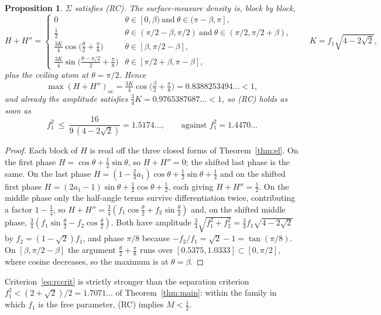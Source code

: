 \documentclass[11pt]{article}
\newtheorem{proposition}[theorem]{Proposition}
\theoremstyle{definition}
\newcommand{\Sig}{\Sigma}
\begin{document}
\begin{proposition}\label{prop:rcsigma}
$\Sig$ satisfies (RC). The surface-measure density is, block by block,
\[
  H+H''=
  \begin{cases}
    0 & \theta\in[0,\beta)\ \text{and}\ \theta\in(\pi-\beta,\pi],\\
    \tfrac12 & \theta\in(\pi/2-\beta,\pi/2)\ \text{and}\ \theta\in(\pi/2,\pi/2+\beta),\\
    \tfrac{3K}{4}\cos\bigl(\tfrac\theta2+\tfrac\pi8\bigr) & \theta\in[\beta,\pi/2-\beta],\\
    \tfrac{3K}{4}\sin\bigl(\tfrac{\theta-\pi/2}{2}+\tfrac\pi8\bigr)
      & \theta\in[\pi/2+\beta,\pi-\beta],
  \end{cases}
  \qquad K=f_1\sqrt{4-2\sqrt2},
\]
plus the ceiling atom at $\theta=\pi/2$. Hence
\[
  \max(H+H'')_{\mathrm{ac}}
  =\tfrac{3K}{4}\cos\bigl(\tfrac\beta2+\tfrac\pi8\bigr)=0.8388253494\ldots<1 ,
\]
and already the amplitude satisfies $\tfrac34K=0.9765387687\ldots<1$, so (RC) holds as
soon as
\begin{equation}\label{eq:rccrit}
  f_1^2\ \le\ \frac{16}{9\,(4-2\sqrt2)}=1.5174\ldots,
  \qquad\text{against } f_1^2=1.4470\ldots
\end{equation}
\end{proposition}

\begin{proof}
Each block of $H$ is read off the three closed forms of Theorem~\ref{thm:el}. On the
first phase $H=\cos\theta+\tfrac12\sin\theta$, so $H+H''=0$; the shifted last phase is
the same. On the last phase $H=(1-\tfrac23a_1)\cos\theta+\tfrac12\sin\theta+\tfrac12$ and
on the shifted first phase $H=(2a_1-1)\sin\theta+\tfrac12\cos\theta+\tfrac12$, each giving
$H+H''=\tfrac12$. On the middle phase only the half-angle terms survive
differentiation twice, contributing a factor $1-\tfrac14$, so
$H+H''=\tfrac34(f_1\cos\tfrac\theta2+f_2\sin\tfrac\theta2)$ and, on the shifted middle
phase, $\tfrac34(f_1\sin\tfrac\theta2-f_2\cos\tfrac\theta2)$. Both have amplitude
$\tfrac34\sqrt{f_1^2+f_2^2}=\tfrac34f_1\sqrt{4-2\sqrt2}$ by
$f_2=(1-\sqrt2)f_1$, and phase $\pi/8$ because $-f_2/f_1=\sqrt2-1=\tan(\pi/8)$. On
$[\beta,\pi/2-\beta]$ the argument $\tfrac\theta2+\tfrac\pi8$ runs over
$[0.5375,1.0333]\subset[0,\pi/2]$, where cosine decreases, so the maximum is at
$\theta=\beta$.
\end{proof}

Criterion~\eqref{eq:rccrit} is strictly stronger than the separation criterion
$f_1^2<(2+\sqrt2)/2=1.7071\ldots$ of Theorem~\ref{thm:main}: within the family in which
$f_1$ is the free parameter, (RC) implies $M<\tfrac12$.
\end{document}
